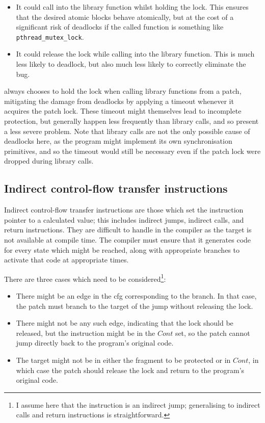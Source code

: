 \begin{itemize}
\item It could call into the library function whilst holding the lock.
  This ensures that the desired atomic blocks behave atomically, but
  at the cost of a significant risk of deadlocks if the called
  function is something like \texttt{pthread\_mutex\_lock}.
\item It could release the lock while calling into the library
  function.  This is much less likely to deadlock, but also much
  less likely to correctly eliminate the bug.
\end{itemize}

{\Implementation} always chooses to hold the lock when calling library
functions from a patch, mitigating the damage from deadlocks by
applying a timeout whenever it acquires the patch lock.  These timeout
might themselves lead to incomplete protection, but generally happen
less frequently than library calls, and so present a less severe
problem.  Note that library calls are not the only possible cause of
deadlocks here, as the program might implement its own synchronisation
primitives\cite{Jannesari2010}, and so the timeout would still be
necessary even if the patch lock were dropped during library calls.

\subsection{Indirect control-flow transfer instructions}

Indirect control-flow transfer instructions are those which set the
instruction pointer to a calculated value; this includes indirect
jumps, indirect calls, and return instructions.  They are difficult to
handle in the compiler as the target is not available at compile time.
The compiler must ensure that it generates code for every state which
might be reached, along with appropriate branches to activate that
code at appropriate times.

There are three cases which need to be considered\footnote{I assume
  here that the instruction is an indirect jump; generalising to
  indirect calls and return instructions is straightforward.
  }:

\begin{itemize}
\item There might be an edge in the \gls{cfg} corresponding to the
  branch.  In that case, the patch must branch to the target of the
  jump without releasing the lock.
\item There might not be any such edge, indicating that the lock
  should be released, but the instruction might be in the
  $\mathit{Cont}$ set, so the patch cannot jump directly back to the
  program's original code.
\item The target might not be in either the fragment to be protected
  or in $\mathit{Cont}$, in which case the patch should release the
  lock and return to the program's original code.
\end{itemize}

